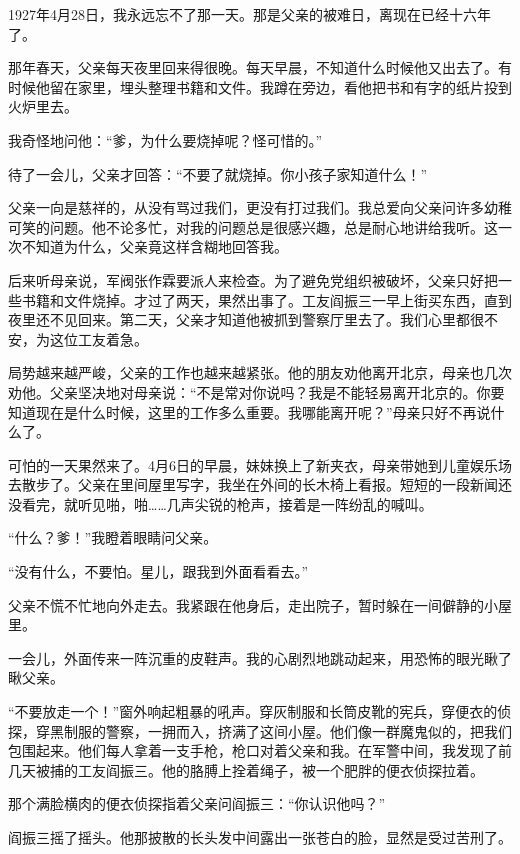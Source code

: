 \documentclass[12pt,UTF-8,openany]{ctexbook}
\begin{document}
\begin{Large}
    
    1927年4月28日，我永远忘不了那一天。那是父亲的被难日，离现在已经十六年了。
    
    那年春天，父亲每天夜里回来得很晚。每天早晨，不知道什么时候他又出去了。有时候他留在家里，埋头整理书籍和文件。我蹲在旁边，看他把书和有字的纸片投到火炉里去。
    
    我奇怪地问他：“爹，为什么要烧掉呢？怪可惜的。”
    
    待了一会儿，父亲才回答：“不要了就烧掉。你小孩子家知道什么！”
    
    父亲一向是慈祥的，从没有骂过我们，更没有打过我们。我总爱向父亲问许多幼稚可笑的问题。他不论多忙，对我的问题总是很感兴趣，总是耐心地讲给我听。这一次不知道为什么，父亲竟这样含糊地回答我。
    
    后来听母亲说，军阀张作霖要派人来检查。为了避免党组织被破坏，父亲只好把一些书籍和文件烧掉。才过了两天，果然出事了。工友阎振三一早上街买东西，直到夜里还不见回来。第二天，父亲才知道他被抓到警察厅里去了。我们心里都很不安，为这位工友着急。
    
    局势越来越严峻，父亲的工作也越来越紧张。他的朋友劝他离开北京，母亲也几次劝他。父亲坚决地对母亲说：“不是常对你说吗？我是不能轻易离开北京的。你要知道现在是什么时候，这里的工作多么重要。我哪能离开呢？”母亲只好不再说什么了。
    
    可怕的一天果然来了。4月6日的早晨，妹妹换上了新夹衣，母亲带她到儿童娱乐场去散步了。父亲在里间屋里写字，我坐在外间的长木椅上看报。短短的一段新闻还没看完，就听见啪，啪……几声尖锐的枪声，接着是一阵纷乱的喊叫。
    
    “什么？爹！”我瞪着眼睛问父亲。
    
    “没有什么，不要怕。星儿，跟我到外面看看去。”
    
    父亲不慌不忙地向外走去。我紧跟在他身后，走出院子，暂时躲在一间僻静的小屋里。
    
    一会儿，外面传来一阵沉重的皮鞋声。我的心剧烈地跳动起来，用恐怖的眼光瞅了瞅父亲。
    
    “不要放走一个！”窗外响起粗暴的吼声。穿灰制服和长筒皮靴的宪兵，穿便衣的侦探，穿黑制服的警察，一拥而入，挤满了这间小屋。他们像一群魔鬼似的，把我们包围起来。他们每人拿着一支手枪，枪口对着父亲和我。在军警中间，我发现了前几天被捕的工友阎振三。他的胳膊上拴着绳子，被一个肥胖的便衣侦探拉着。
    
    那个满脸横肉的便衣侦探指着父亲问阎振三：“你认识他吗？”
    
    阎振三摇了摇头。他那披散的长头发中间露出一张苍白的脸，显然是受过苦刑了。
    

\end{Large}
\end{document}
